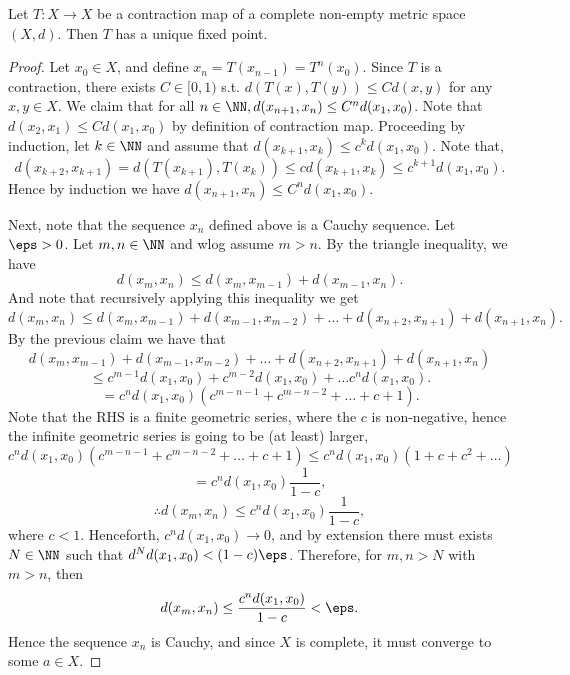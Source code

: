 \begin{theorem}
  Let $T:X\to X$ be a contraction map of a complete non-empty metric space
  $(X,d)$. Then $T$ has a unique fixed point.
  \label{thm:ContractionMapping}
\end{theorem}
\begin{proof}
  Let $x_0\in X$, and define $x_n=T(x_{n-1})=T^n(x_0)$.
  Since $T$ is a contraction, there exists $C\in[0,1)$ s.t. $d(T(x),T(y))\leq
  Cd(x,y)$ for any $x,y\in X$. We claim that for all $n\in\NN,
  d(x_{n+1},x_n)\leq C^n d(x_1,x_0)$. Note that $d(x_2,x_1)\leq C d(x_1,x_0)$ by
  definition of contraction map. Proceeding by induction, let $k\in\NN$ and
  assume that $d(x_{k+1},x_k)\leq c^k d(x_1,x_0)$. Note that,
  \[d(x_{k+2},x_{k+1}) =d(T(x_{k+1}), T(x_{k})) \leq cd(x_{k+1},x_k) \leq
  c^{k+1} d(x_1,x_0).\]
  Hence by induction we have $d(x_{n+1},x_n)\leq C^nd(x_1,x_0)$.

  Next, note that the sequence $x_n$ defined above is a Cauchy sequence. Let
  $\eps>0$. Let $m,n\in\NN$ and wlog assume $m>n$. By the triangle inequality,
  we have 
  \[d(x_m,x_n) \leq d(x_{m},x_{m-1}) + d(x_{m-1},x_n).\]
  And note that recursively applying this inequality we get
  \[d(x_m,x_n) \leq d(x_m,x_{m-1})+d(x_{m-1},x_{m-2})+\dots
  +d(x_{n+2},x_{n+1}) + d(x_{n+1}, x_n).\]
  By the previous claim we have that 
  \[d(x_m,x_{m-1})+d(x_{m-1},x_{m-2})+\dots
  +d(x_{n+2},x_{n+1}) + d(x_{n+1}, x_n) \]
  \[\leq c^{m-1}d(x_1,x_0) +
  c^{m-2}d(x_1,x_0) + \dots c^n d(x_1,x_0).\]
  \[= c^nd(x_1,x_0) \left( c^{m-n-1}+c^{m-n-2}+\dots +c+1 \right).\]
  Note that the RHS is a finite geometric series, where the $c$ is non-negative,
  hence the infinite geometric series is going to be (at least) larger,
  \[c^nd(x_1,x_0) \left( c^{m-n-1}+c^{m-n-2}+\dots +c+1 \right) \leq
  c^nd(x_1,x_0) \left( 1+c+c^2+\dots \right)\]
  \[=c^n d(x_1,x_0) \frac{1}{1-c},\]
  \[\therefore d(x_m,x_n) \leq c^n d(x_1,x_0) \frac{1}{1-c},\]
  where $c<1$. Henceforth, $c^nd(x_1,x_0)\to 0$, and by extension there must
  exists $N\in\NN$ such that $d^Nd(x_1,x_0)< (1-c) \eps$. Therefore, for $m,n>N$
  with $m>n$, then 
  \[d(x_m,x_n) \leq \frac{c^nd(x_1,x_0)}{1-c} < \eps.\]
  Hence the sequence $x_n$ is Cauchy, and since $X$ is complete, it must
  converge to some $a\in X$.


\end{proof}
